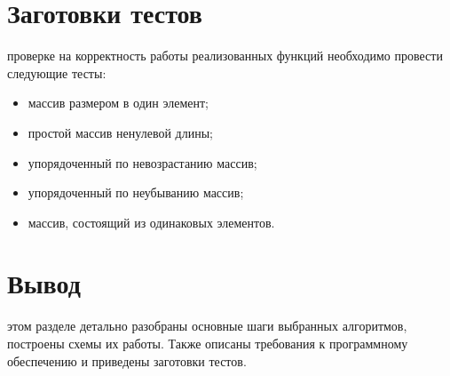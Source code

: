 \section{Заготовки тестов}
 проверке на корректность работы реализованных функций необходимо провести следующие тесты:
\begin{itemize}
	\item массив размером в один элемент;
	\item простой массив ненулевой длины;
	\item упорядоченный по невозрастанию массив;
	\item упорядоченный по неубыванию массив;
	\item массив, состоящий из одинаковых элементов.
\end{itemize}

\section*{Вывод}
 этом разделе детально разобраны основные шаги выбранных алгоритмов, построены схемы их работы. Также описаны требования к программному обеспечению и приведены заготовки тестов.